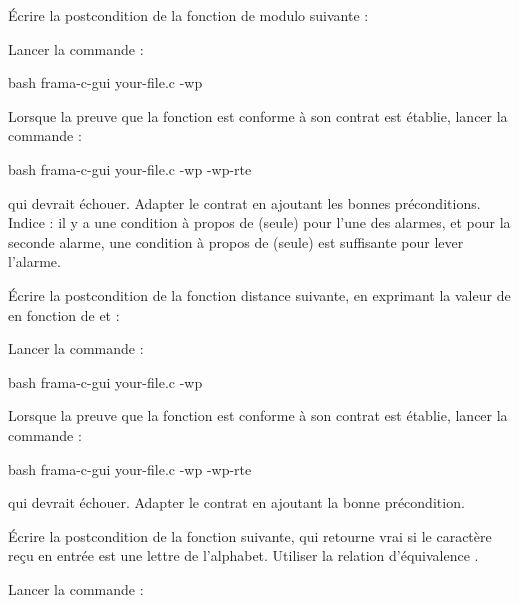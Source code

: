 

Écrire la postcondition de la fonction de modulo suivante :




Lancer la commande :

\begin{CodeBlock}{bash}
frama-c-gui your-file.c -wp
\end{CodeBlock}


Lorsque la preuve que la fonction est conforme à son contrat est établie, lancer
la commande :
\begin{CodeBlock}{bash}
frama-c-gui your-file.c -wp -wp-rte
\end{CodeBlock}
qui devrait échouer. Adapter le contrat en ajoutant les bonnes préconditions.
Indice : il y a une condition à propos de  (seule) pour l'une des
alarmes, et pour la seconde alarme, une condition à propos de 
(seule) est suffisante pour lever l'alarme.






Écrire la postcondition de la fonction distance suivante, en exprimant
la valeur de  en fonction de  et
 :




Lancer la commande :


\begin{CodeBlock}{bash}
frama-c-gui your-file.c -wp
\end{CodeBlock}


Lorsque la preuve que la fonction est conforme à son contrat est établie, lancer
la commande :
\begin{CodeBlock}{bash}
frama-c-gui your-file.c -wp -wp-rte
\end{CodeBlock}
qui devrait échouer. Adapter le contrat en ajoutant la bonne précondition.






Écrire la postcondition de la fonction suivante, qui retourne vrai si le
caractère reçu en entrée est une lettre de l'alphabet. Utiliser la relation
d'équivalence  \CodeInline{<==>}.




Lancer la commande :


